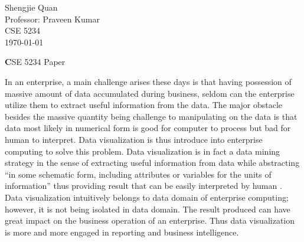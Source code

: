 \documentclass[12pt]{article}
\title{}
\author{}
\date{}                                           %
\begin{document}
\begin{flushleft}
Shengjie Quan\\
Professor: Praveen Kumar\\
CSE 5234 \\
\today \\

\begin{center}
\textbf
CSE 5234 Paper
\end{center}

\setlength{\parindent}{0.5in}
In an enterprise, a main challenge arises these days is that having possession of massive amount of data accumulated during business, seldom can the enterprise utilize them to extract useful information from the data. The major obstacle besides the massive quantity being challenge to manipulating on the data is that data most likely in numerical form is good for computer to process but bad for human to interpret. Data visualization is thus introduce into enterprise computing to solve this problem. Data visualization is in fact a data mining strategy in the sense of extracting useful information from data while abstracting ``in some schematic form, including attributes or variables for the units of information'' thus providing result that can be easily interpreted by human \cite{mith}. Data visualization intuitively belongs to data domain of enterprise computing; however, it is not being isolated in data domain. The result produced can have great impact on the business operation of an enterprise. Thus data visualization is more and more engaged in reporting and business intelligence.


\end{flushleft}
\end{document}
